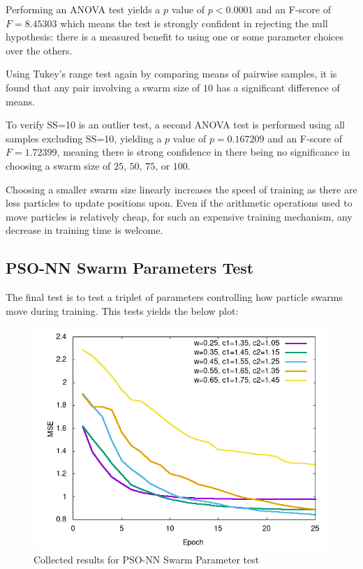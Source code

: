 \documentclass[a4paper,12pt]{article}
\begin{document}
Performing an ANOVA test yields a $p$ value of $p < 0.0001$ and an F-score of $F = 8.45303$ which means the test is strongly confident in rejecting the null hypothesis: there is a measured benefit to using one or some parameter choices over the others.

Using Tukey's range test again by comparing means of pairwise samples, it is found that any pair involving a swarm size of $10$ has a significant difference of means.

To verify SS=10 is an outlier test, a second ANOVA test is performed using all samples excluding SS=10, yielding a $p$ value of $p = 0.167209$ and an F-score of $F = 1.72399$, meaning there is strong confidence in there being no significance in choosing a swarm size of $25$, $50$, $75$, or $100$.

Choosing a smaller swarm size linearly increases the speed of training as there are less particles to update positions upon. Even if the arithmetic operations used to move particles is relatively cheap, for such an expensive training mechanism, any decrease in training time is welcome.

\pagebreak

\subsection{PSO-NN Swarm Parameters Test}

The final test is to test a triplet of parameters controlling how particle swarms move during training. This tests yields the below plot:

\begin{figure}[h!]
\centering
\includegraphics[scale=0.60]{images/pso-par-plot.png}
\caption{Collected results for PSO-NN Swarm Parameter test}
\label{fig:pso-nn-par}
\end{figure}
\end{document}
